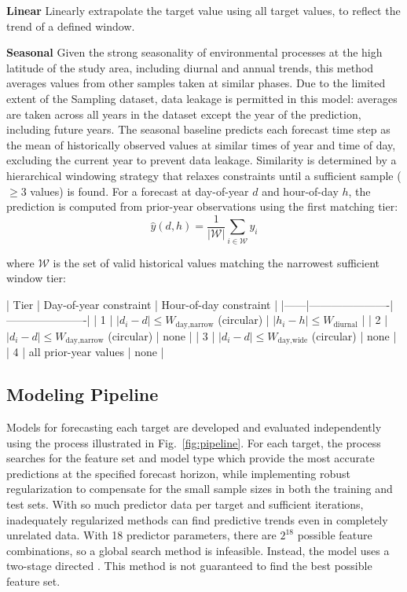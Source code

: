 \documentclass[resources,article,submit,pdftex,moreauthors]{Definitions/mdpi}
\begin{document}
\textbf{Linear} Linearly extrapolate the target value using all target values, to reflect the trend of a defined window.

\textbf{Seasonal} Given the strong seasonality of environmental processes at the high latitude of the study area, including diurnal and annual trends, this method averages values from other samples taken at similar phases. Due to the limited extent of the Sampling dataset, data leakage is permitted in this model: averages are taken across all years in the dataset except the year of the prediction, including future years. The seasonal baseline predicts each forecast time step as the mean of historically observed values at similar times of year and time of day, excluding the current year to prevent data leakage. Similarity is determined by a hierarchical windowing strategy that relaxes constraints until a sufficient sample ($\geq 3$ values) is found. For a forecast at day-of-year $d$ and hour-of-day $h$, the prediction is computed from prior-year observations using the first matching tier: $$\hat{y}(d, h) = \frac{1}{|\mathcal{W}|}\sum_{i \in \mathcal{W}} y_i$$

where $\mathcal{W}$ is the set of valid historical values matching the narrowest sufficient window tier:

| Tier | Day-of-year constraint | Hour-of-day constraint |
|------|----------------------|----------------------|
| 1 | $|d_i - d| \leq W_{\text{day,narrow}}$ (circular) | $|h_i - h| \leq W_{\text{diurnal}}$ |
| 2 | $|d_i - d| \leq W_{\text{day,narrow}}$ (circular) | none |
| 3 | $|d_i - d| \leq W_{\text{day,wide}}$ (circular) | none |
| 4 | all prior-year values | none |


\subsection{Modeling Pipeline}
\label{ch:ModelingPipeline}

Models for forecasting each target are developed and evaluated independently using the process illustrated in Fig.~\ref{fig:pipeline}. For each target, the process searches for the feature set and model type which provide the most accurate predictions at the specified forecast horizon, while implementing robust regularization to compensate for the small sample sizes in both the training and test sets. With so much predictor data per target and sufficient iterations, inadequately regularized methods can find predictive trends even in completely unrelated data. With 18 predictor parameters, there are $2^{18}$ possible feature combinations, so a global search method is infeasible. Instead, the model uses a two-stage directed . This method is not guaranteed to find the best possible feature set.
\end{document}
